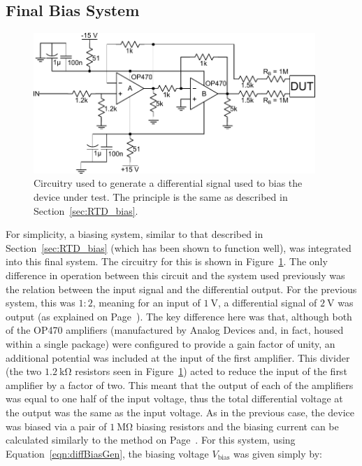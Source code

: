 \subsection{Final Bias System}\label{ssec:final_bias}
\begin{figure}[t]
\begin{center}
\includegraphics[width = 0.95\textwidth]{figures/final_bias}
\caption[Differential bias generator used with final readout system]{Circuitry used to generate a differential signal used to bias the device under test. The principle is the same as described in Section~\ref{sec:RTD_bias}.}
\label{fig:final_currGen}
\end{center}
\end{figure}
For simplicity, a biasing system, similar to that described in Section~\ref{sec:RTD_bias} (which has been shown to function well), was integrated into this final system. The circuitry for this is shown in Figure~\ref{fig:final_currGen}. The only difference in operation between this circuit and the system used previously was the relation between the input signal and the differential output. For the previous system, this was $1:2$, meaning for an input of $1~\mathrm{V}$, a differential signal of $2~\mathrm{V}$ was output (as explained on Page~\pageref{res:RTDVbias}). The key difference here was that, although both of the OP470 amplifiers (manufactured by Analog Devices and, in fact, housed within a single package) were configured to provide a gain factor of unity, an additional potential was included at the input of the first amplifier. This divider (the two $1.2~\mathrm{k\Omega}$ resistors seen in Figure~\ref{fig:final_currGen}) acted to reduce the input of the first amplifier by a factor of two. This meant that the output of each of the amplifiers was equal to one half of the input voltage, thus the total differential voltage at the output was the same as the input voltage. As in the previous case, the device was biased via a pair of $1~\mathrm{M\Omega}$ biasing resistors and the biasing current can be calculated similarly to the method on Page~\pageref{eqn:diffBiasGen}. For this system, using Equation~\ref{eqn:diffBiasGen}, the biasing voltage $V_{\mathrm{bias}}$ was given simply by:
